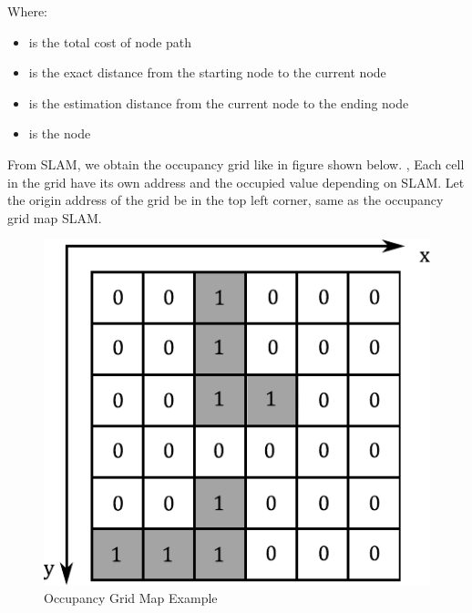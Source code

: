 Where:
\begin{itemize}
	\item { is the total cost of node path}
	\item { is the exact distance from the starting node to the current node}
	\item { is the estimation distance from the current node to the ending node}
	\item { is the node}

\end{itemize}

\hspace{1.27cm}
From SLAM, we obtain the occupancy grid like in figure shown below. \textbf{\figureautorefname{ \ref{fig:Occupancy Grid Map Example}}}, Each cell in the grid have its own address and the occupied value depending on SLAM. Let the origin address of the grid be in the top left corner, same as the occupancy grid map SLAM.\par
\begin{figure}[ht]
	\centering
	\includegraphics[scale=1]{images/imagess/6pp-ocm-cell-exmpl.pdf}
	\caption{Occupancy Grid Map Example}
	\label{fig:Occupancy Grid Map Example}
\end{figure}


